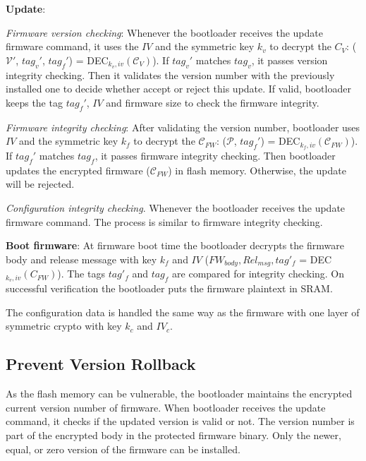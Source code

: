 \documentclass[11pt,oneside,onecolumn,letterpaper]{article}
\begin{document}
\textbf{Update}: 

\textit{Firmware version checking}:
Whenever the bootloader receives the update firmware command, it uses the $IV$ and the symmetric key $k_v$ to decrypt the $C_V$: ($\mathcal{V}'$, $tag_v'$, $tag_f'$) = DEC$_{k_v, iv}(\mathcal{C}_V)$).
If $tag_v'$ matches $tag_v$, it passes version integrity checking.
Then it validates the version number with the previously installed one to decide whether accept or reject this update.
If valid, bootloader keeps the tag $tag_f'$, $IV$ and firmware size to check the firmware integrity.

\textit{Firmware integrity checking}:
After validating the version number, bootloader uses $IV$ and the symmetric key $k_f$ to decrypt the $\mathcal{C}_{FW}$: ($\mathcal{P}$, $tag_f'$) = DEC$_{k_f, iv}(\mathcal{C}_{FW})$).
If $tag_f'$ matches $tag_f$, it passes firmware integrity checking.
Then bootloader updates the encrypted firmware ($\mathcal{C}_{FW}$) in flash memory.
Otherwise, the update will be rejected.

\textit{Configuration integrity checking}.
Whenever the bootloader receives the update firmware command.
The process is similar to firmware integrity checking.

\textbf{Boot firmware}: 
At firmware boot time the bootloader decrypts the firmware body and release message with key $k_f$ and $IV$ ($FW_{body}, Rel_{msg}, tag'_f$ = DEC$_{k_v, iv}(C_{FW})$).
The tags $tag'_f$ and $tag_f$ are compared for integrity checking.
On successful verification the bootloader puts the firmware plaintext in SRAM.

The configuration data is handled the same way as the firmware with one layer of symmetric crypto with key $k_c$ and $IV_c$.

\subsection{Prevent Version Rollback}
As the flash memory can be vulnerable, the bootloader maintains the encrypted current version number of firmware.
When bootloader receives the update command, it checks if the updated version is valid or not.
The version number is part of the encrypted body in the protected firmware binary.
Only the newer, equal, or zero version of the firmware can be installed.
\end{document}
